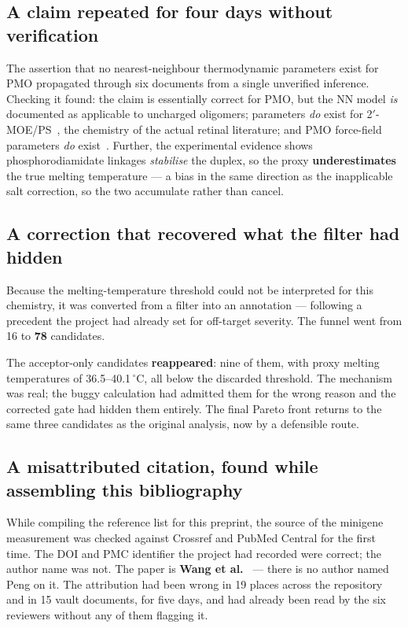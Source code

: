 \documentclass[11pt,a4paper]{article}
\begin{document}
\subsection{A claim repeated for four days without verification}

The assertion that no nearest-neighbour thermodynamic parameters exist for PMO propagated through
six documents from a single unverified inference. Checking it found: the claim is essentially
correct for PMO, but the NN model \emph{is} documented as applicable to uncharged oligomers;
parameters \emph{do} exist for 2$'$-MOE/PS~\cite{park2025}, the chemistry of the actual retinal
literature; and PMO force-field parameters \emph{do} exist~\cite{maksudov2023}. Further, the
experimental evidence shows phosphorodiamidate linkages \emph{stabilise} the duplex, so the proxy
\textbf{underestimates} the true melting temperature --- a bias in the same direction as the
inapplicable salt correction, so the two accumulate rather than cancel.

\subsection{A correction that recovered what the filter had hidden}
\label{sec:recovered}

Because the melting-temperature threshold could not be interpreted for this chemistry, it was
converted from a filter into an annotation --- following a precedent the project had already set for
off-target severity. The funnel went from 16 to \textbf{78} candidates.

The acceptor-only candidates \textbf{reappeared}: nine of them, with proxy melting temperatures of
36.5--40.1\,$^\circ$C, all below the discarded threshold. The mechanism was real; the buggy
calculation had admitted them for the wrong reason and the corrected gate had hidden them entirely.
The final Pareto front returns to the same three candidates as the original analysis, now by a
defensible route.

\subsection{A misattributed citation, found while assembling this bibliography}
\label{sec:misattribution}

While compiling the reference list for this preprint, the source of the minigene measurement was
checked against Crossref and PubMed Central for the first time. The DOI and PMC identifier the
project had recorded were correct; the author name was not. The paper is
\textbf{Wang et al.}~\cite{wang2025} --- there is no author named Peng on it. The attribution had
been wrong in 19 places across the repository and in 15 vault documents, for five days, and had
already been read by the six reviewers without any of them flagging it.
\end{document}
